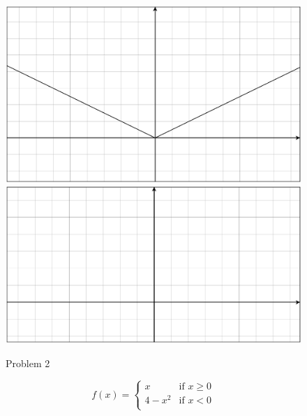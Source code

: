 \documentclass[fleqn,addpoints]{exam}
\begin{document}
\begin{questions}
\begin{parts}
          \begin{figure}[H]
            \centering
            \ifprintanswers
              \includegraphics[scale=.4]{problem_2_solution.eps}
            \else
              \includegraphics[scale=.6]{problem_2_blank.eps}
            \fi
            \caption*{Problem 2}
          \end{figure}

    \end{parts}

  \ifprintanswers
  \else
    \pagebreak
  \fi

  \question
    \[
      f(x) = 
        \begin{cases}
          x       & \text{if } x \geq 0 \\
          4 - x^2 & \text{if } x < 0 \\
        \end{cases}
    \]

\end{questions}
\end{document}
